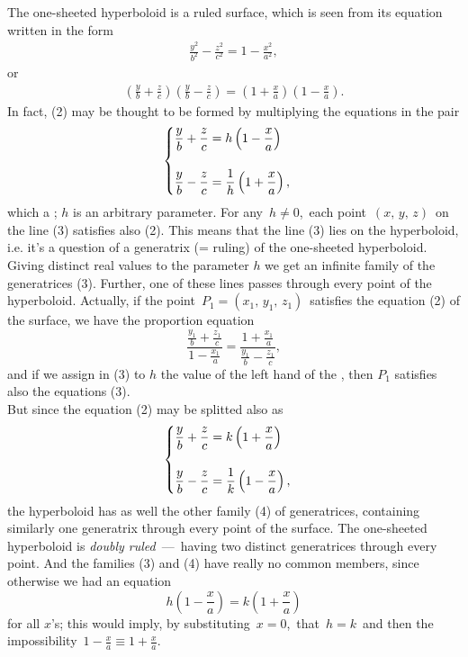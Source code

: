 \documentclass[12pt]{article}
\begin{document}
The one-sheeted hyperboloid is a ruled surface, which is seen from its equation written in the form
\begin{align}
  \frac{y^2}{b^2}-\frac{z^2}{c^2} = 1-\frac{x^2}{a^2},
\end{align}
or
\begin{align}
  \left(\frac{y}{b}+\frac{z}{c}\right)\left(\frac{y}{b}-\frac{z}{c}\right) = 
   \left(1+\frac{x}{a}\right)\left(1-\frac{x}{a}\right).
\end{align}
In fact, (2) may be thought to be formed by multiplying the equations in the pair
\begin{align}
\begin{cases}
      \displaystyle{\frac{y}{b}+\frac{z}{c} = h\left(1-\frac{x}{a}\right)} \vspace{15pt} \\  
      \displaystyle{\frac{y}{b}-\frac{z}{c} = \frac{1}{h}\left(1+\frac{x}{a}\right),}
\end{cases}
\end{align}
which  a ; $h$ is an arbitrary parameter.  For any\, $h \neq 0$,\, each point \,$(x,\,y,\,z)$\, on the line (3) satisfies also (2).  This means that the line (3) lies on the hyperboloid, i.e. it's a question of a generatrix (= ruling) of the one-sheeted hyperboloid.\\

Giving distinct real values to the parameter $h$ we get an infinite family of the generatrices (3).  Further, one of these lines passes through every point of the hyperboloid.  Actually, if the point\, $P_1 = (x_1,\,y_1,\,z_1)$\, satisfies the equation (2) of the surface, we have the proportion equation
 $$\frac{\frac{y_1}{b}+\frac{z_1}{c}}{1-\frac{x_1}{a}} = \frac{1+\frac{x_1}{a}}{\frac{y_1}{b}-\frac{z_1}{c}},$$ 
and if we assign in (3) to $h$ the value of the left hand  of the , then $P_1$ satisfies also the equations (3).\\

But since the equation (2) may be splitted also as
\begin{align}
\begin{cases}
      \displaystyle{\frac{y}{b}+\frac{z}{c} = k\left(1+\frac{x}{a}\right)} \vspace{15pt} \\  
      \displaystyle{\frac{y}{b}-\frac{z}{c} = \frac{1}{k}\left(1-\frac{x}{a}\right),}
\end{cases}
\end{align}
the hyperboloid has as well the other family (4) of generatrices, containing similarly one generatrix through every point of the surface.  The one-sheeted hyperboloid is {\em doubly ruled}\, ---\, having two distinct generatrices through every point.  And the families (3) and (4) have really no common members, since otherwise we had an equation
$$h\left(1-\frac{x}{a}\right) = k\left(1+\frac{x}{a}\right)$$
for all $x$'s; this would imply, by substituting\, $x = 0$,\, that\, $h = k$\, and then the impossibility\, 
$\displaystyle{1-\frac{x}{a} \equiv 1+\frac{x}{a}}$.\\
\end{document}
